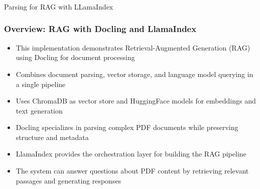 \begin{frame}[fragile]\frametitle{}
\begin{center}
{\Large Parsing for RAG with LLamaIndex}

\end{center}
\end{frame}

\begin{frame}[fragile]\frametitle{Overview: RAG with Docling and LlamaIndex}
      \begin{itemize}
          \item This implementation demonstrates Retrieval-Augmented Generation (RAG) using Docling for document processing
          \item Combines document parsing, vector storage, and language model querying in a single pipeline
          \item Uses ChromaDB as vector store and HuggingFace models for embeddings and text generation
          \item Docling specializes in parsing complex PDF documents while preserving structure and metadata
          \item LlamaIndex provides the orchestration layer for building the RAG pipeline
          \item The system can answer questions about PDF content by retrieving relevant passages and generating responses
      \end{itemize}
\end{frame}

